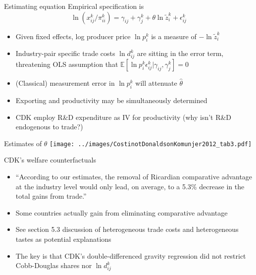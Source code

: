 \documentclass[11pt,notes=hide,aspectratio=169]{beamer}
\begin{document}
\begin{frame}{Estimating equation}
Empirical specification is
\begin{equation*}
\ln \left({x}_{ij}^{k}/\pi_{ii}^k \right) = \gamma_{ij} + \gamma_j^k + \theta \ln \tilde{z}_{i}^{k} + \epsilon_{ij}^k
\end{equation*}
\begin{itemize}
	\item Given fixed effects, log producer price $\ln p_i^k$ is a measure of $-\ln \tilde{z}_{i}^{k}$
	\item Industry-pair specific trade costs $\ln d_{ij}^k$ are sitting in the error term,
	threatening OLS assumption that $\mathbb{E}\left[\ln p_i^k \epsilon_{ij}^k\vert \gamma_{ij},\gamma_j^k\right]=0$
	\item (Classical) measurement error in $\ln p_i^k$ will attenuate $\hat{\theta}$
	\item Exporting and productivity may be simultaneously determined
	\item CDK employ R\&D expenditure as IV for productivity (why isn't R\&D endogenous to trade?)
\end{itemize}
\end{frame}
\begin{frame}{Estimates of $\theta$}
\texttt{[image: ../images/CostinotDonaldsonKomunjer2012\_tab3.pdf]}
\end{frame}
\begin{frame}{CDK's welfare counterfactuals}
\begin{itemize}
	\item ``According to our estimates, the removal of Ricardian comparative advantage at the industry level would only lead, on average, to a 5.3\% decrease in the total gains from trade.''
	\item Some countries actually gain from eliminating comparative advantage
	\item See section 5.3 discussion of heterogeneous trade costs and heterogeneous tastes as potential explanations
	\item The key is that CDK's double-differenced gravity regression did not restrict Cobb-Douglas shares nor $\ln d_{ij}^k$
\end{itemize}
\end{frame}
\end{document}
